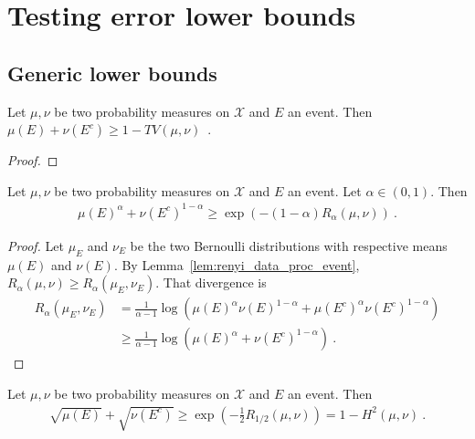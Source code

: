 \chapter{Testing error lower bounds}

\section{Generic lower bounds}

\begin{lemma}
  \label{lem:testing_bound_tv}
  Let $\mu, \nu$ be two probability measures on $\mathcal X$ and $E$ an event. Then $\mu(E) + \nu(E^c) \ge 1 - TV(\mu, \nu)$~.
\end{lemma}

\begin{proof}
\end{proof}

\begin{lemma}
  \label{lem:testing_bound_renyi_mean}
  Let $\mu, \nu$ be two probability measures on $\mathcal X$ and $E$ an event. Let $\alpha \in (0,1)$. Then
  \begin{align*}
  \mu(E)^\alpha + \nu(E^c)^{1 - \alpha}
  \ge \exp\left(-(1 - \alpha) R_{\alpha}(\mu, \nu)\right)
  \: .
  \end{align*}
\end{lemma}

\begin{proof}
Let $\mu_E$ and $\nu_E$ be the two Bernoulli distributions with respective means $\mu(E)$ and $\nu(E)$.
By Lemma~\ref{lem:renyi_data_proc_event}, $R_\alpha(\mu, \nu) \ge R_\alpha(\mu_E, \nu_E)$. That divergence is
\begin{align*}
R_\alpha(\mu_E, \nu_E)
&= \frac{1}{\alpha - 1}\log \left(\mu(E)^\alpha \nu(E)^{1 - \alpha}
  + \mu(E^c)^\alpha \nu(E^c)^{1 - \alpha}\right)
\\
&\ge \frac{1}{\alpha - 1}\log \left(\mu(E)^\alpha + \nu(E^c)^{1 - \alpha}\right)
\: .
\end{align*}
\end{proof}

\begin{corollary}
  \label{cor:testing_bound_hellinger}
  Let $\mu, \nu$ be two probability measures on $\mathcal X$ and $E$ an event. Then
  \begin{align*}
  \sqrt{\mu(E)} + \sqrt{\nu(E^c)}
  \ge \exp\left(-\frac{1}{2} R_{1/2}(\mu, \nu)\right)
  = 1 - H^2(\mu, \nu)
  \: .
  \end{align*}
\end{corollary}

